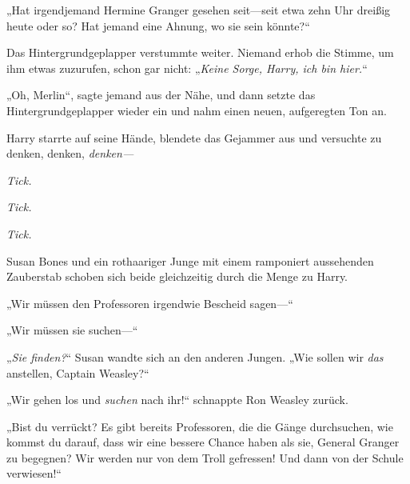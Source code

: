 „Hat irgendjemand Hermine Granger gesehen seit—seit etwa zehn Uhr dreißig heute oder so? Hat jemand eine Ahnung, wo sie sein könnte?“


Das Hintergrundgeplapper verstummte weiter. Niemand erhob die Stimme, um ihm etwas zuzurufen, schon gar nicht: „\emph{Keine Sorge, Harry, ich bin hier.}“

„Oh, Merlin“, sagte jemand aus der Nähe, und dann setzte das Hintergrundgeplapper wieder ein und nahm einen neuen, aufgeregten Ton an.

Harry starrte auf seine Hände, blendete das Gejammer aus und versuchte zu denken, denken, \emph{denken—}

\emph{Tick.}

\emph{Tick.}

\emph{Tick.}

Susan Bones und ein rothaariger Junge mit einem ramponiert aussehenden Zauberstab schoben sich beide gleichzeitig durch die Menge zu Harry.

„Wir müssen den Professoren irgendwie Bescheid sagen—“

„Wir müssen sie suchen—“

„\emph{Sie finden?}“ Susan wandte sich an den anderen Jungen.
„Wie sollen wir \emph{das} anstellen, Captain Weasley?“

„Wir gehen los und \emph{suchen} nach ihr!“ schnappte Ron Weasley zurück.

„Bist du verrückt? Es gibt bereits Professoren, die die Gänge durchsuchen, wie kommst du darauf, dass wir eine bessere Chance haben als sie, General Granger zu begegnen? Wir werden nur von dem Troll gefressen! Und dann von der Schule verwiesen!“

